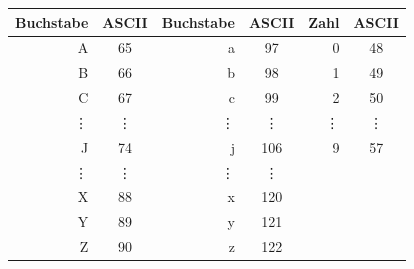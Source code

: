 \documentclass[ngerman,12pt]{article}
\begin{document}
\begin{table}[ht]
	\label{table:asciimaping}
	\centering
	\begin{tabular}{|r|c|r|c|r|c|}
		\hline
		\textbf{Buchstabe} & \textbf{ASCII} & \textbf{Buchstabe} & \textbf{ASCII} & \textbf{Zahl} & \textbf{ASCII}\\
		\hline
		A & 65 & a & 97 & 0 & 48\\
		\hline
		B & 66 & b & 98 & 1 & 49\\
		\hline
		C & 67 & c & 99 & 2 & 50\\
		\hline
		\multirow{3}{*}{\vdots} & \multirow{3}{*}{\vdots} & \multirow{3}{*}{\vdots} & \multirow{3}{*}{\vdots} &  \multirow{3}{*}{\vdots} & \multirow{3}{*}{\vdots}\\
		& & & & & \\
		& & & & & \\
		\hline
		J & 74 & j & 106 & 9 & 57\\
		\hline
		\multirow{3}{*}{\vdots} & \multirow{3}{*}{\vdots} & \multirow{3}{*}{\vdots} & \multirow{3}{*}{\vdots} &  & \\
		& & & & & \\
		& & & & & \\
		\hline
		X & 88 & x & 120 & &\\
		\hline
		Y & 89 & y & 121 & &\\
		\hline
		Z & 90 & z & 122 & &\\
		\hline
		
	\end{tabular}
\end{table}
\end{document}

